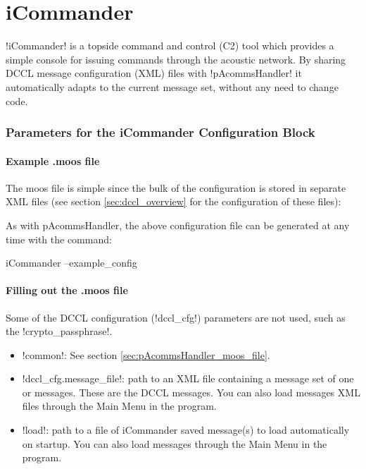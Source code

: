 \section{iCommander}\label{sec:icommander} 

!iCommander! is a topside command and control (C2) tool which provides a simple
console for issuing commands through the acoustic network. By sharing
DCCL message configuration (XML) files with !pAcommsHandler! it automatically adapts to the current message set,
without any need to change code.

\subsubsection{Parameters for the iCommander Configuration Block}
\paragraph{Example .moos file}
The moos file is simple since the bulk of the configuration is stored in separate XML files (see section \ref{sec:dccl_overview} for the configuration of these files):

\resetbvlinenumber
As with pAcommsHandler, the above configuration file can be generated at any time with the command:
\begin{boxedverbatim}
iCommander --example_config
\end{boxedverbatim}
\resetbvlinenumber


\paragraph{Filling out the .moos file}

Some of the DCCL configuration (!dccl_cfg!) parameters are not used, such as the !crypto_passphrase!. 

\begin{itemize}
\item !common!: See section \ref{sec:pAcommsHandler_moos_file}.
\item !dccl_cfg.message_file!: path to an XML file containing a message set of one or messages. These are the DCCL messages. You can also load messages XML files through the Main Menu in the program.
\item !load!: path to a file of iCommander saved message(s) to load automatically on startup. You can also load messages through the Main Menu in the program.
\end{itemize}

